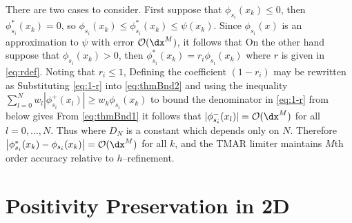 \documentclass{ametsoc}
\begin{document}
\begin{pf}
There are two cases to consider. First suppose that $\phi_{s_i}(x_k) \leq 0$, then $\phi_{s_i}^*(x_k) = 0$, so $\phi_{s_i}(x_k) \leq \phi^*_{s_i}(x_k) \leq \psi(x_k)$. Since $\phi_{s_i}(x)$ is an approximation to $\psi$ with error $\mathcal{O}(\dx^{M})$, it follows that
On the other hand suppose that $\phi_{s_i}(x_k) > 0$, then $\phi_{s_i}^*(x_k) = r_i \phi_{s_i}(x_k)$ where $r$ is given in \eqref{eq:rdef}. Noting that $r_i \leq 1$,
Defining 
the coefficient $(1-r_i)$ may be rewritten as
Substituting \eqref{eq:1-r} into \eqref{eq:thmBnd2} and using the inequality $\sum\limits_{l=0}^N w_l \left| \phi_{s_i}^+(x_l) \right| \geq w_k \phi_{s_i}(x_k)$ to bound the denominator in \eqref{eq:1-r} from below gives
From \eqref{eq:thmBnd1} it follows that $|\phi_{s_i}^{-}(x_l)| = \mathcal{O}(\dx^{M})$ for all $l=0,\dots,N$. Thus
where $D_N$ is a constant which depends only on $N$. Therefore $\left| \phi^*_{s_i}(x_k) - \phi_{s_i}(x_k) \right| = \mathcal{O}(\dx^{M})$ for all $k$, and  the TMAR limiter maintains $M$th order accuracy relative to $h$--refinement.
\end{pf}

\section{Positivity Preservation in 2D} \label{sec:pp2d}
\end{document}
